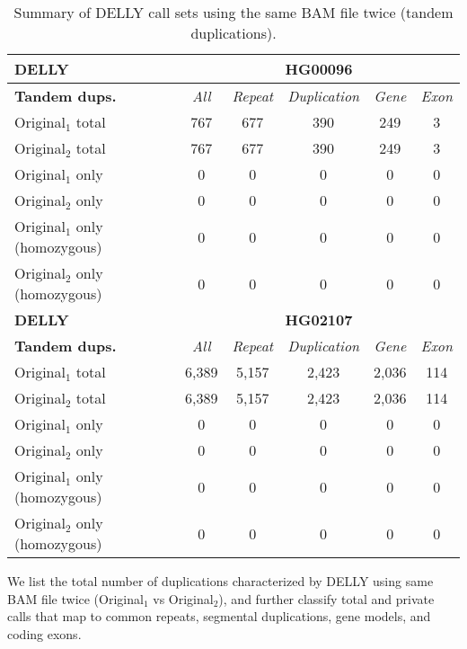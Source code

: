 \begin{table}[htb]
\caption{ Summary of DELLY call sets using the same BAM file twice (tandem duplications). }
\begin{center}
\begin{tabular}{|l|c||c|c|c|c|}
\hline
{\bf DELLY} & \multicolumn{5}{|c|}{\bf HG00096} \\
\hline
\cline{2-6}
{\bf Tandem dups.} & {\it All} & {\it Repeat} & {\it Duplication} & {\it Gene} & {\it Exon} \\
\hline
Original$_1$ total & 767 & 677 & 390 & 249 & 3\\ 
\hline
Original$_2$ total & 767 & 677 & 390 & 249 & 3\\ 
\hline
Original$_1$ only & 0 & 0 & 0 & 0 & 0\\ 
\hline
Original$_2$ only & 0 & 0 & 0 & 0 & 0\\ 
\hline
Original$_1$ only (homozygous) & 0 & 0 & 0 & 0 & 0\\ 
\hline
Original$_2$ only (homozygous) & 0 & 0 & 0 & 0 & 0\\ 
\hline
\hline
{\bf DELLY} & \multicolumn{5}{|c|}{\bf HG02107} \\
\hline
\cline{2-6}
{\bf Tandem dups.} & {\it All} & {\it Repeat} & {\it Duplication} & {\it Gene} & {\it Exon} \\
\hline
Original$_1$ total & 6,389 & 5,157 & 2,423 & 2,036 & 114\\ 
\hline
Original$_2$ total & 6,389 & 5,157 & 2,423 & 2,036 & 114\\ 
\hline
Original$_1$ only & 0 & 0 & 0 & 0 & 0\\ 
\hline
Original$_2$ only & 0 & 0 & 0 & 0 & 0\\ 
\hline
Original$_1$ only (homozygous) & 0 & 0 & 0 & 0 & 0\\ 
\hline
Original$_2$ only (homozygous) & 0 & 0 & 0 & 0 & 0\\ 
\hline
\end{tabular}
\end{center}
{\footnotesize We list the total number of duplications characterized by DELLY using same BAM file twice (Original$_1$ vs Original$_2$), 
and further classify total and private calls that map to common repeats, segmental duplications, gene models, and coding exons.}
\label{supptab:orig-vs-orig2-delly-dups}
\end{table}

